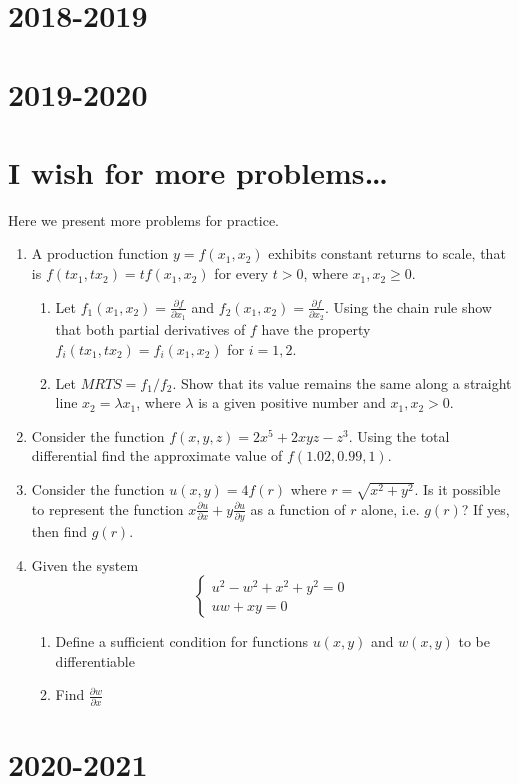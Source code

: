 \documentclass[12pt]{article} %
\theoremstyle{definition} %
\begin{document}
\section{2018-2019}





\section{2019-2020}




\section{I wish for more problems\ldots}

Here we present more problems for practice.

\begin{enumerate}
\item A production function $y=f(x_1, x_2)$ exhibits constant returns to scale, that is $f(tx_1,tx_2)=tf(x_1,x_2)$ for every $t>0$, where $x_1, x_2 \geq 0$.
\begin{enumerate}
\item Let $f_1(x_1,x_2)=\frac{\partial f}{\partial x_1}$ and $f_2(x_1,x_2)=\frac{\partial f}{\partial x_2}$. Using the chain rule show that both partial derivatives of $f$ have the property $f_i(tx_1,tx_2)=f_i(x_1,x_2)$ for $i=1,2$.
\item Let $MRTS=f_1/f_2$. Show that its value remains the same along a straight line $x_2=\lambda x_1$, where $\lambda$ is a given positive number and $x_1, x_2>0$.
\end{enumerate}

\item Consider the function $f(x,y,z)=2x^5+2xyz-z^3$. Using the total differential find the approximate value of $f(1.02,0.99,1)$.

\item Consider the function $u(x,y)=4f(r)$ where $r=\sqrt{x^2+y^2}$. Is it possible to represent the function $x\frac{\partial u}{\partial x}+y\frac{\partial u}{\partial y}$ as a function of $r$ alone, i.e. $g(r)$? If yes, then find $g(r)$.

\item Given the system
\begin{equation} \nonumber
\begin{cases}
u^2-w^2+x^2+y^2=0 \\
uw+xy=0
\end{cases}
\end{equation}
\begin{enumerate}
\item Define a sufficient condition for functions $u(x,y)$ and $w(x,y)$ to be differentiable
\item Find $\frac{\partial w}{\partial x}$
\end{enumerate}

\end{enumerate}

\section{2020-2021}


\end{document}

